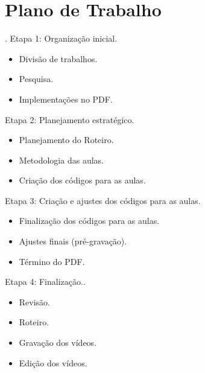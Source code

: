 \documentclass[a4paper,12pt]{article}  %
\begin{document}


\section{Plano de Trabalho}

.
     Etapa 1: Organização inicial.
    \begin{itemize}
        \item Divisão de trabalhos.
        \item Pesquisa.
        \item Implementações no PDF.
    \end{itemize}
     Etapa 2: Planejamento estratégico.
    \begin{itemize}
        \item Planejamento do Roteiro.
        \item Metodologia das aulas.
        \item Criação dos códigos para as aulas.
    \end{itemize}
     Etapa 3: Criação e ajustes dos códigos para as aulas.
    \begin{itemize}
        \item Finalização dos códigos para as aulas.
        \item Ajustes finais (pré-gravação).
        \item Término do PDF.
    \end{itemize}
     Etapa 4: Finalização..
    \begin{itemize}
        \item Revisão.
        \item Roteiro.
        \item Gravação dos vídeos.
        \item Edição dos vídeos.
    \end{itemize}
\end{document}
